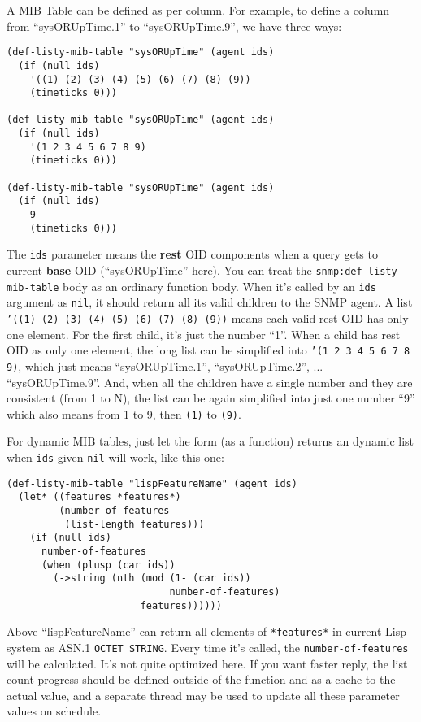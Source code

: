 \documentclass[reprint,natbib,9pt]{sigplanconf}
\begin{document}
A MIB Table can be defined as per column. For example, to define a
column from ``sysORUpTime.1'' to ``sysORUpTime.9'', we have three
ways:
%
\begin{verbatim}
(def-listy-mib-table "sysORUpTime" (agent ids)
  (if (null ids)
    '((1) (2) (3) (4) (5) (6) (7) (8) (9))
    (timeticks 0)))

(def-listy-mib-table "sysORUpTime" (agent ids)
  (if (null ids)
    '(1 2 3 4 5 6 7 8 9)
    (timeticks 0)))

(def-listy-mib-table "sysORUpTime" (agent ids)
  (if (null ids)
    9
    (timeticks 0)))
\end{verbatim}

The \texttt{ids} parameter means the \textbf{rest} OID components
when a query gets to current \textbf{base} OID (``sysORUpTime'' here).
You can treat the \texttt{snmp:def-listy-mib-table} body as an ordinary
function body. When
it's called by an \texttt{ids} argument as \texttt{nil}, it should
return all its valid children to the SNMP agent. A list \texttt{'((1)
  (2) (3) (4) (5) (6) (7) (8) (9))} means each valid rest OID
has only one element. For the first child, it's just the number
``1''. When a child has rest OID as only one element, the
long list can be simplified into \texttt{'(1 2 3 4 5 6 7 8 9)}, which
just means ``sysORUpTime.1'', ``sysORUpTime.2'',
... ``sysORUpTime.9''. And, when all the children have a single number
and they are consistent (from 1 to N), the list can be again simplified
into just one number ``9'' which also means from 1 to 9, then
\texttt{(1)} to \texttt{(9)}.

For dynamic MIB tables, just let the form (as a function) returns an
dynamic list when \texttt{ids} given \texttt{nil} will work, like this
one:
%
\begin{verbatim}
(def-listy-mib-table "lispFeatureName" (agent ids)
  (let* ((features *features*)
         (number-of-features
          (list-length features)))
    (if (null ids)
      number-of-features
      (when (plusp (car ids))
        (->string (nth (mod (1- (car ids))
                            number-of-features)
                       features))))))
\end{verbatim}

Above ``lispFeatureName'' can return all elements of
\texttt{*features*} in current Lisp system as ASN.1 \texttt{OCTET
  STRING}. Every time it's called, the \texttt{number-of-features}
will be calculated. It's not 	quite optimized here. If you want faster
reply, the list count progress should be defined outside of the
function and as a cache to the actual value, and a separate thread may
be used to update all these parameter values on schedule.
\end{document}
